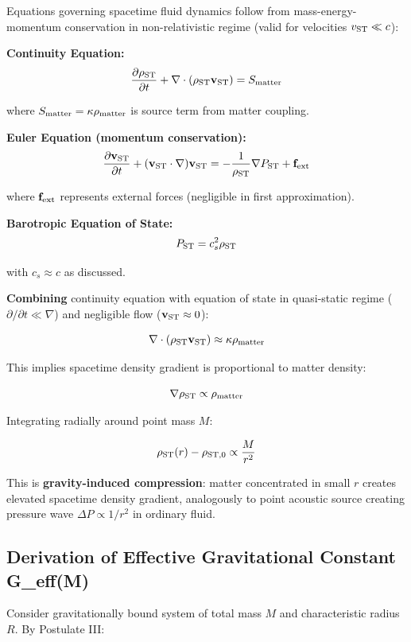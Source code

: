 \documentclass[11pt,a4paper]{article}
\begin{document}
Equations governing spacetime fluid dynamics follow from
mass-energy-momentum conservation in non-relativistic regime (valid for
velocities \(v_{\rm ST} \ll c\)):

\textbf{Continuity Equation:}
\[\frac{\partial \rho_{\rm ST}}{\partial t} + \nabla \cdot (\rho_{\rm ST} {\bf v}_{\rm ST}) = S_{\rm matter}\]

where \(S_{\rm matter} = \kappa \rho_{\rm matter}\) is source term from
matter coupling.

\textbf{Euler Equation (momentum conservation):}
\[\frac{\partial {\bf v}_{\rm ST}}{\partial t} + ({\bf v}_{\rm ST} \cdot \nabla) {\bf v}_{\rm ST} = -\frac{1}{\rho_{\rm ST}} \nabla P_{\rm ST} + {\bf f}_{\rm ext}\]

where \({\bf f}_{\rm ext}\) represents external forces (negligible in
first approximation).

\textbf{Barotropic Equation of State:}
\[P_{\rm ST} = c_s^2 \rho_{\rm ST}\]

with \(c_s \approx c\) as discussed.

\textbf{Combining} continuity equation with equation of state in
quasi-static regime (\(\partial/\partial t \ll \nabla\)) and negligible
flow (\({\bf v}_{\rm ST} \approx 0\)):

\[\nabla \cdot (\rho_{\rm ST} {\bf v}_{\rm ST}) \approx \kappa \rho_{\rm matter}\]

This implies spacetime density gradient is proportional to matter
density:

\[\nabla \rho_{\rm ST} \propto \rho_{\rm matter}\]

Integrating radially around point mass \(M\):

\[\rho_{\rm ST}(r) - \rho_{\rm ST,0} \propto \frac{M}{r^2}\]

This is \textbf{gravity-induced compression}: matter concentrated in
small \(r\) creates elevated spacetime density gradient, analogously to
point acoustic source creating pressure wave \(\Delta P \propto 1/r^2\)
in ordinary fluid.

\hypertarget{derivation-of-effective-gravitational-constant-g_effm}{%
\subsection{Derivation of Effective Gravitational Constant
G\_eff(M)}\label{derivation-of-effective-gravitational-constant-g_effm}}

Consider gravitationally bound system of total mass \(M\) and
characteristic radius \(R\). By Postulate III:
\end{document}
